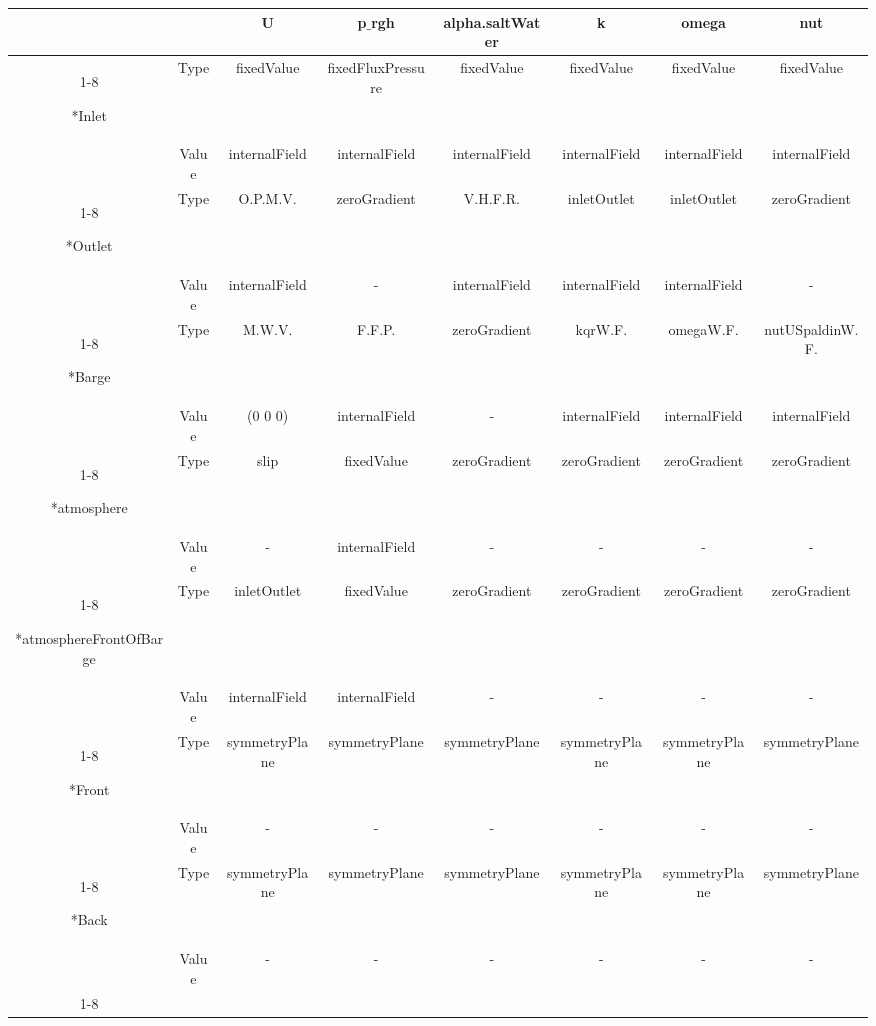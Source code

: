 \documentclass[a4paper, 12pt]{report}
\begin{document}
\begin{landscape}
	\begin{table}[H]
		\centering
		\begin{tabular}{c|c|c|c|c|c|c|c}
			\multicolumn{2}{c|}{\diagbox{Boundary}{Variable}} & U&p$\_$rgh & alpha.saltWater  & k & omega & nut \\\cline{1-8}
			
			\multirow{2}*{Inlet} & Type & fixedValue & fixedFluxPressure & fixedValue &  fixedValue & fixedValue & fixedValue\\
			&Value & internalField & internalField & internalField &  internalField & internalField &internalField \\\cline{1-8}
			
			\multirow{2}*{Outlet} & Type & O.P.M.V. & zeroGradient & V.H.F.R. &  inletOutlet & inletOutlet & zeroGradient\\
			&Value & internalField & - & internalField &  internalField & internalField &- \\\cline{1-8}
			
			\multirow{2}*{Barge} & Type & M.W.V. & F.F.P. & zeroGradient & kqrW.F. & omegaW.F. & nutUSpaldinW.F.\\
			&Value & (0 0 0) & internalField & - & internalField & internalField &internalField \\\cline{1-8}
			
			\multirow{2}*{atmosphere} & Type & slip & fixedValue & zeroGradient & zeroGradient & zeroGradient & zeroGradient\\
			&Value & - & internalField & - &  - &- &-\\\cline{1-8}
			
			\multirow{2}*{atmosphereFrontOfBarge} & Type & inletOutlet & fixedValue & zeroGradient &  zeroGradient & zeroGradient & zeroGradient\\
			&Value & internalField & internalField & - & - & - &-\\\cline{1-8}
			
			\multirow{2}*{Front} & Type & symmetryPlane & symmetryPlane & symmetryPlane &  symmetryPlane &symmetryPlane & symmetryPlane\\
			&Value & - & -& - & - &- &-\\\cline{1-8}
			
			\multirow{2}*{Back} & Type & symmetryPlane & symmetryPlane & symmetryPlane & symmetryPlane & symmetryPlane & symmetryPlane\\
			&Value & - & - & - & - & -& -\\\cline{1-8}
			

\end{tabular}
\end{table}
\end{landscape}
\end{document}
